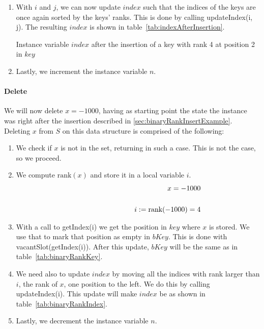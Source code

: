 \begin{enumerate}
    \item
    With $i$ and $j$, we can now update $index$ such that the indices of the keys are once again sorted by the keys' ranks. This is done by calling {\ttfamily updateIndex(i, j)}. The resulting $index$ is shown in table~\ref{tab:indexAfterInsertion}.
    \begin{table}[H]
    \centering
    
    \caption{Instance variable $index$ after the insertion of a key with rank 4 at position 2 in $key$}
    \label{tab:indexAfterInsertion}
    \end{table}
    
    \item
    Lastly, we increment the instance variable $n$.
\end{enumerate}

\paragraph{Delete}

We will now delete $x = -1000$, having as starting point the state the instance was right after the insertion described in \ref{sec:binaryRankInsertExample}. Deleting $x$ from $S$ on this data structure is comprised of the following:
\begin{enumerate}
    \item
    We check if $x$ is not in the set, returning in such a case.
    This is not the case, so we proceed.
    
    \item
    We compute $\text{rank}(x)$ and store it in a local variable $i$.
    \begin{align*}
        x = -1000 \\
        \cline{1-2}
        i := \text{rank}(-1000) = 4
    \end{align*}
    
    \item
    With a call to {\ttfamily getIndex(i)} we get the position in $key$ where $x$ is stored. We use that to mark that position as empty in $bKey$. This is done with {\ttfamily vacantSlot(getIndex(i))}. After this update, $bKey$ will be the same as in table~\ref{tab:binaryRankKey}.
    
    \item
    We need also to update $index$ by moving all the indices with rank larger than $i$, the rank of $x$, one position to the left. We do this by calling {\ttfamily updateIndex(i)}. This update will make $index$ be as shown in table~\ref{tab:binaryRankIndex}.
    
    \item
    Lastly, we decrement the instance variable $n$.
\end{enumerate}





